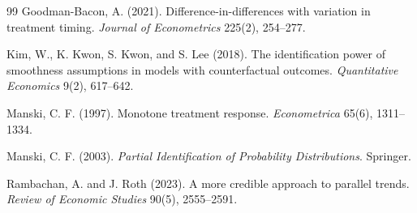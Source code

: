 \documentclass[11pt]{article}
\theoremstyle{definition}
\theoremstyle{plain}
\theoremstyle{remark}
\begin{document}
\begin{thebibliography}{99}
Goodman-Bacon, A. (2021).
\newblock Difference-in-differences with variation in treatment timing.
\newblock \emph{Journal of Econometrics} 225(2), 254--277.

Kim, W., K. Kwon, S. Kwon, and S. Lee (2018).
\newblock The identification power of smoothness assumptions in models with counterfactual outcomes.
\newblock \emph{Quantitative Economics} 9(2), 617--642.

Manski, C. F. (1997).
\newblock Monotone treatment response.
\newblock \emph{Econometrica} 65(6), 1311--1334.

Manski, C. F. (2003).
\newblock \emph{Partial Identification of Probability Distributions}.
\newblock Springer.

Rambachan, A. and J. Roth (2023).
\newblock A more credible approach to parallel trends.
\newblock \emph{Review of Economic Studies} 90(5), 2555--2591.
\end{thebibliography}
\end{document}

